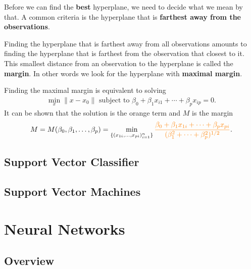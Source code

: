 \documentclass[aspectratio=169,10pt]{beamer}
\begin{document}
\begin{frame}{\secname}{\subsecname}
  Before we can find the \textbf{best} hyperplane, we need to decide what we mean by that.
  A common criteria is the hyperplane that is \textbf{farthest away from the observations}.

  Finding the hyperplane that is farthest away from all observations amounts to finding the hyperplane that is farthest from the observation that closest to it.
  This smallest distance from an observation to the hyperplane is called the \textbf{margin}.
  In other words we look for the hyperplane with \textbf{maximal margin}.

  Finding the maximal margin is equivalent to solving
  \begin{align}
    \min_x \| x - x_0 \| \text{ subject to } \beta_0 + \beta_1x_{i1} + \cdots + \beta_p x_{ip} = 0.
  \end{align}
  It can be shown that the solution is the {\color{orange} orange term} and $M$ is the margin
  \begin{align}
    M = M(\beta_0, \beta_1, \ldots, \beta_p)
    = \min_{\{ (x_{1i}, \ldots, x_{pi})^n_{i = 1}\}}{\color{orange}\frac{\beta_0 + \beta_1 x_{1i} + \cdots + \beta_px_{pi}}{(\beta_1^2 + \cdots + \beta_p^2)^{1/2}}}.
  \end{align}
\end{frame}

\subsection{Support Vector Classifier}
\begin{frame}{\secname}{\subsecname}
  
\end{frame}

\subsection{Support Vector Machines}
\begin{frame}{\secname}{\subsecname}
  
\end{frame}

\section{Neural Networks}

\subsection{Overview}
\begin{frame}{\secname}{\subsecname}
  
\end{frame}
\end{document}
